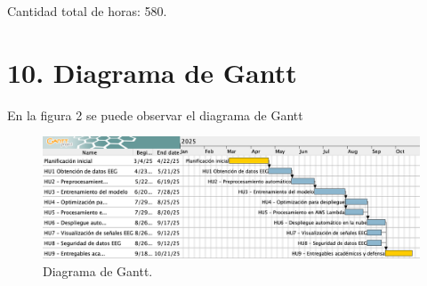 \documentclass[
11pt, %
]{charter}
\begin{document}
Cantidad total de horas: 580.
\section{10. Diagrama de Gantt}
\label{sec:gantt}

En la figura 2 se puede observar el diagrama de Gantt
\begin{landscape}
\begin{figure}[htpb]
\includegraphics[scale=0.45]{./Figuras/gantt4.png}
\caption{Diagrama de Gantt.}
\label{fig:diagBloques}
\end{figure}
\end{landscape}
\clearpage
\end{document}
